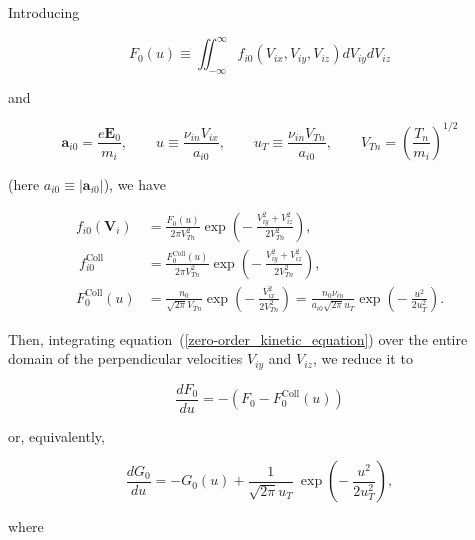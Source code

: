 \documentclass[draft]{agujournal2019}
\renewcommand{\vec}{\mathbf}
\begin{document}
{Introducing
\begin{linenomath*}
\begin{equation}
F_{0}(u)\equiv\iint_{-\infty}^{\infty}f_{i0}(V_{ix},V_{iy},V_{iz})dV_{iy}dV_{iz} 
\label{F_0_Review}
\end{equation}
\end{linenomath*}
and
\begin{linenomath*}
\begin{equation}
\vec{a}_{i0}=\frac{e\vec{E}_{0}}{m_{i}},\qquad u\equiv\frac{\nu_{in}V_{ix}
}{a_{i0}},\qquad u_{T}\equiv\frac{\nu_{in}V_{Tn}}{a_{i0}},\qquad
V_{Tn}=\left(  \frac{T_{n}}{m_{i}}\right)  ^{1/2} 
\label{a_0,u,u_T,V_Ti}
\end{equation}
\end{linenomath*}
(here $a_{i0}\equiv|\vec{a}_{i0}|$), we have
\begin{linenomath*}
\begin{align}
f_{i0}(\vec{V}_{i})  &  =\frac{F_{0}\left(  u\right)  }{2\pi V_{Tn}^{2}}%
\exp\left(  -\ \frac{V_{iy}^{2}+V_{iz}^{2}}{2V_{Tn}^{2}}\right)
,\label{f_via_F_0}\\
\ f_{i0}^{\mathrm{Coll}}  &  =\frac{F_{0}^{\mathrm{Coll}}\left(  u\right)
}{2\pi V_{Tn}^{2}}\exp\left(  -\ \frac{V_{iy}^{2}+V_{iz}^{2}}{2V_{Tn}^{2}%
}\right)  ,\nonumber\\
F_{0}^{\mathrm{Coll}}\left(  u\right)   &  =\frac{n_{0}}{\sqrt{2\pi}V_{Tn}%
}\exp\left(  -\ \frac{V_{ix}^{2}}{2V_{Tn}^{2}}\right)  =\frac{n_{0}\nu_{in}%
}{a_{i0}\sqrt{2\pi}u_{T}}\exp\left(  -\ \frac{u^{2}}{2u_{T}^{2}}\right)
.\nonumber
\end{align}
\end{linenomath*}
Then, integrating equation~(\ref{zero-order_kinetic_equation}) over the entire
domain of the perpendicular velocities $V_{iy}$ and $V_{iz}$, we reduce it to
\begin{linenomath*}
\begin{equation}
\frac{dF_{0}}{du}=-\left(  F_{0}-F_{0}^{\mathrm{Coll}}\left(  u\right)
\right)  
\label{for_F_0_review}
\end{equation}
\end{linenomath*}
or, equivalently,
\begin{linenomath*}
\begin{equation}
\frac{dG_{0}}{du}=-G_{0}(u)+\frac{1}{\sqrt{2\pi}u_{T}}\ \exp\left(
-\ \frac{u^{2}}{2u_{T}^{2}}\right)  , 
\label{dG_0}
\end{equation}
\end{linenomath*}
where
\begin{linenomath*}

\end{linenomath*}}
\end{document}
